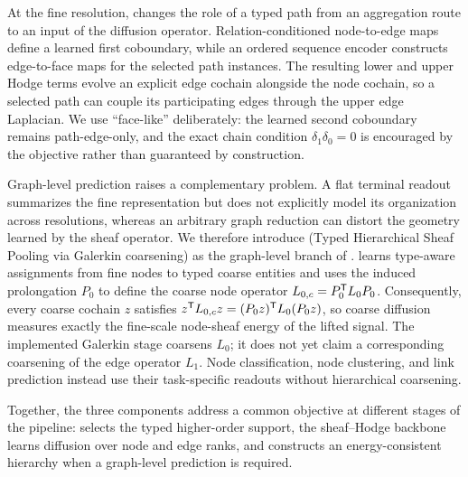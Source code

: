 At the fine resolution, \method{} changes the role of a typed path from an aggregation route to an
input of the diffusion operator. Relation-conditioned node-to-edge maps define a learned first
coboundary, while an ordered sequence encoder constructs edge-to-face maps for the selected path
instances. The resulting lower and upper Hodge terms evolve an explicit edge cochain alongside the
node cochain, so a selected path can couple its participating edges through the upper edge
Laplacian. We use ``face-like'' deliberately: the learned second coboundary remains path-edge-only,
and the exact chain condition $\delta_1\delta_0=0$ is encouraged by the objective rather than
guaranteed by construction.

Graph-level prediction raises a complementary problem. A flat terminal readout summarizes the
fine representation but does not explicitly model its organization across resolutions, whereas an
arbitrary graph reduction can distort the geometry learned by the sheaf operator. We therefore
introduce \thspool{} (Typed Hierarchical Sheaf Pooling via Galerkin coarsening) as the graph-level
branch of \method{}. \thspool{} learns type-aware assignments from fine nodes to typed coarse
entities and uses the induced prolongation $P_0$ to define the coarse node operator
$L_{0,c}=P_0^{\mathsf{T}}L_0P_0$. Consequently, every coarse cochain $z$ satisfies
$z^{\mathsf{T}}L_{0,c}z=(P_0z)^{\mathsf{T}}L_0(P_0z)$, so coarse diffusion measures exactly the
fine-scale node-sheaf energy of the lifted signal. The implemented Galerkin stage coarsens $L_0$;
it does not yet claim a corresponding coarsening of the edge operator $L_1$. Node classification,
node clustering, and link prediction instead use their task-specific readouts without hierarchical
coarsening.

Together, the three components address a common objective at different stages of the pipeline:
\ampss{} selects the typed higher-order support, the sheaf--Hodge backbone learns diffusion over node
and edge ranks, and \thspool{} constructs an energy-consistent hierarchy when a graph-level
prediction is required.

